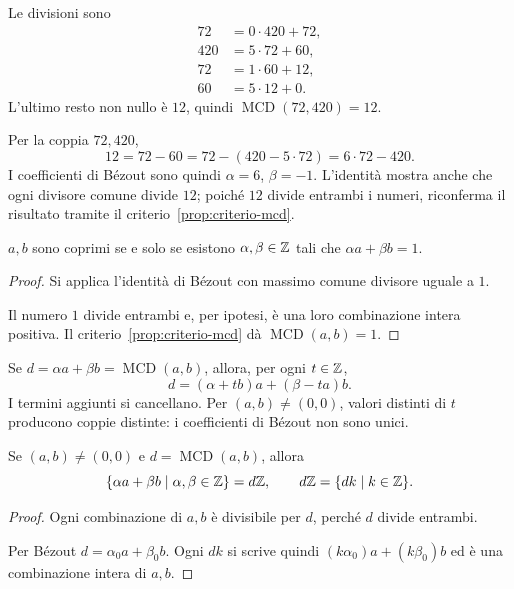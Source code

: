 \begin{esempio}
Le divisioni sono
\[
\begin{aligned}
72&=0\cdot420+72,\\
420&=5\cdot72+60,\\
72&=1\cdot60+12,\\
60&=5\cdot12+0.
\end{aligned}
\]
L'ultimo resto non nullo è $12$, quindi $\operatorname{MCD}(72,420)=12$.
\end{esempio}

\begin{esempio}
Per la coppia $72,420$,
\[
12=72-60=72-(420-5\cdot72)=6\cdot72-420.
\]
I coefficienti di Bézout sono quindi $\alpha=6$, $\beta=-1$. L'identità mostra anche che ogni divisore comune divide $12$; poiché $12$ divide entrambi i numeri, riconferma il risultato tramite il criterio~\ref{prop:criterio-mcd}.
\end{esempio}

\begin{corollario}
$a,b$ sono coprimi se e solo se esistono $\alpha,\beta\in\mathbb{Z}$ tali che $\alpha a+\beta b=1$.
\end{corollario}
\begin{proof}
\passomath{\Rightarrow} Si applica l'identità di Bézout con massimo comune divisore uguale a $1$.

\passomath{\Leftarrow} Il numero $1$ divide entrambi e, per ipotesi, è una loro combinazione intera positiva. Il criterio~\ref{prop:criterio-mcd} dà $\operatorname{MCD}(a,b)=1$.
\end{proof}

\begin{osservazione}
Se $d=\alpha a+\beta b=\operatorname{MCD}(a,b)$, allora, per ogni $t\in\mathbb{Z}$,
\[
d=(\alpha+tb)a+(\beta-ta)b.
\]
I termini aggiunti si cancellano. Per $(a,b)\ne(0,0)$, valori distinti di $t$ producono coppie distinte: i coefficienti di Bézout non sono unici.
\end{osservazione}

\begin{corollario}
Se $(a,b)\ne(0,0)$ e $d=\operatorname{MCD}(a,b)$, allora
\[
\{\alpha a+\beta b\mid\alpha,\beta\in\mathbb{Z}\}=d\mathbb{Z},
\qquad d\mathbb{Z}=\{dk\mid k\in\mathbb{Z}\}.
\]
\end{corollario}
\begin{proof}
\passomath{\subseteq} Ogni combinazione di $a,b$ è divisibile per $d$, perché $d$ divide entrambi.

\passomath{\supseteq} Per Bézout $d=\alpha_0a+\beta_0b$. Ogni $dk$ si scrive quindi $(k\alpha_0)a+(k\beta_0)b$ ed è una combinazione intera di $a,b$.
\end{proof}

